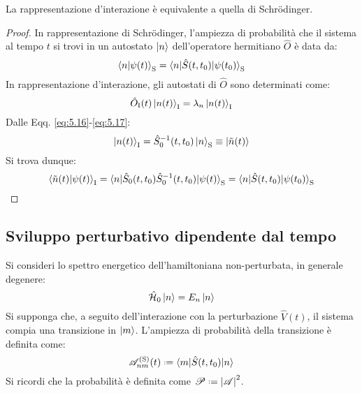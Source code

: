 \begin{proposition}
	La rappresentazione d'interazione è equivalente a quella di Schrödinger.
\end{proposition}
\begin{proof}
	In rappresentazione di Schrödinger, l'ampiezza di probabilità che il sistema al tempo $ t $ si trovi in un autostato $ \ket{n} $ dell'operatore hermitiano $ \hat{O} $ è data da:
	\begin{equation*}
		\braket{n | \psi(t)}_{\text{S}} = \braket{n | \hat{S}(t,t_0) | \psi(t_0)}_{\text{S}}
	\end{equation*}
	In rappresentazione d'interazione, gli autostati di $ \hat{O} $ sono determinati come:
	\begin{equation*}
		\hat{O}_{\text{I}}(t) \ket{n(t)}_{\text{I}} = \lambda_n \ket{n(t)}_{\text{I}}
	\end{equation*}
	Dalle Eqq. \ref{eq:5.16}-\ref{eq:5.17}:
	\begin{equation*}
		\ket{n(t)}_{\text{I}} = \hat{S}^{-1}_0 (t,t_0) \ket{n}_{\text{S}} \equiv \ket{\tilde{n}(t)}
	\end{equation*}
	Si trova dunque:
	\begin{equation*}
		\braket{\tilde{n}(t) | \psi(t)}_{\text{I}} = \braket{n | \hat{S}_0 (t,t_0) \hat{S}^{-1}_0 (t,t_0) | \psi(t)}_{\text{S}} = \braket{n | \hat{S}(t,t_0) | \psi(t_0)}_{\text{S}}
	\end{equation*}
\end{proof}

\subsection{Sviluppo perturbativo dipendente dal tempo}

Si consideri lo spettro energetico dell'hamiltoniana non-perturbata, in generale degenere:
\begin{equation*}
	\hat{\mathcal{H}}_0 \ket{n} = E_n \ket{n}
\end{equation*}
Si supponga che, a seguito dell'interazione con la perturbazione $ \hat{V}(t) $, il sistema compia una transizione in $ \ket{m} $. L'ampiezza di probabilità della transizione è definita come:
\begin{equation}
	\mathscr{A}^{(\text{S})}_{nm}(t) \defeq \braket{m | \hat{S}(t,t_0) | n}
	\label{eq:5.19}
\end{equation}
Si ricordi che la probabilità è definita come $ \mathscr{P} \defeq \abs{\mathscr{A}}^2 $.

